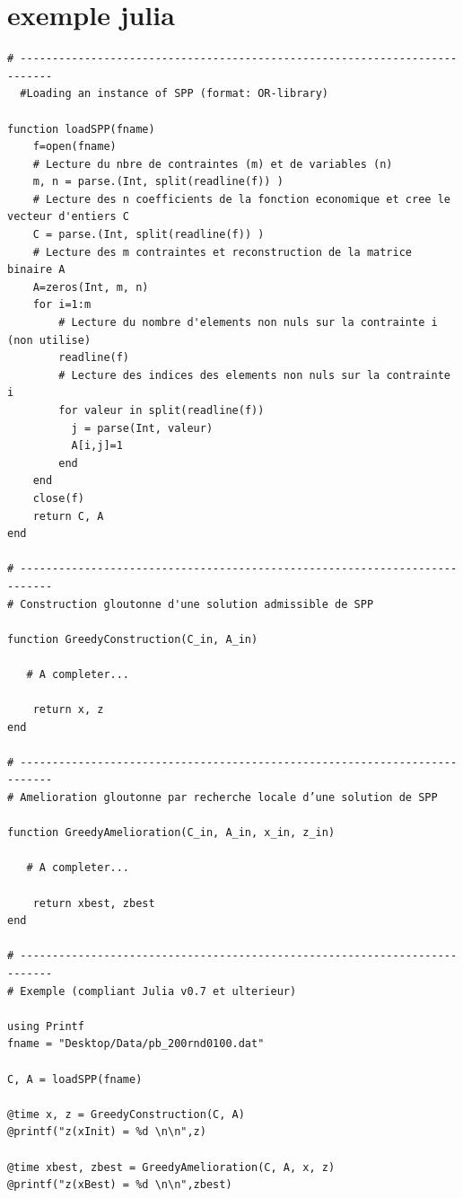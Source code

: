 
\section{exemple julia}

\lstset{language=julia}

{
\begin{lstlisting}
# --------------------------------------------------------------------------- 
  #Loading an instance of SPP (format: OR-library)

function loadSPP(fname)
    f=open(fname)
    # Lecture du nbre de contraintes (m) et de variables (n)
    m, n = parse.(Int, split(readline(f)) )
    # Lecture des n coefficients de la fonction economique et cree le vecteur d'entiers C
    C = parse.(Int, split(readline(f)) )
    # Lecture des m contraintes et reconstruction de la matrice binaire A
    A=zeros(Int, m, n)
    for i=1:m
        # Lecture du nombre d'elements non nuls sur la contrainte i (non utilise)
        readline(f)
        # Lecture des indices des elements non nuls sur la contrainte i
        for valeur in split(readline(f))
          j = parse(Int, valeur)
          A[i,j]=1
        end
    end
    close(f)
    return C, A
end

# --------------------------------------------------------------------------- 
# Construction gloutonne d'une solution admissible de SPP

function GreedyConstruction(C_in, A_in)

   # A completer...
   
    return x, z
end

# --------------------------------------------------------------------------- 
# Amelioration gloutonne par recherche locale d’une solution de SPP

function GreedyAmelioration(C_in, A_in, x_in, z_in)

   # A completer...
   
    return xbest, zbest
end

# --------------------------------------------------------------------------- 
# Exemple (compliant Julia v0.7 et ulterieur)

using Printf
fname = "Desktop/Data/pb_200rnd0100.dat"

C, A = loadSPP(fname)

@time x, z = GreedyConstruction(C, A)
@printf("z(xInit) = %d \n\n",z)

@time xbest, zbest = GreedyAmelioration(C, A, x, z)
@printf("z(xBest) = %d \n\n",zbest)
\end{lstlisting}
}
%
%
